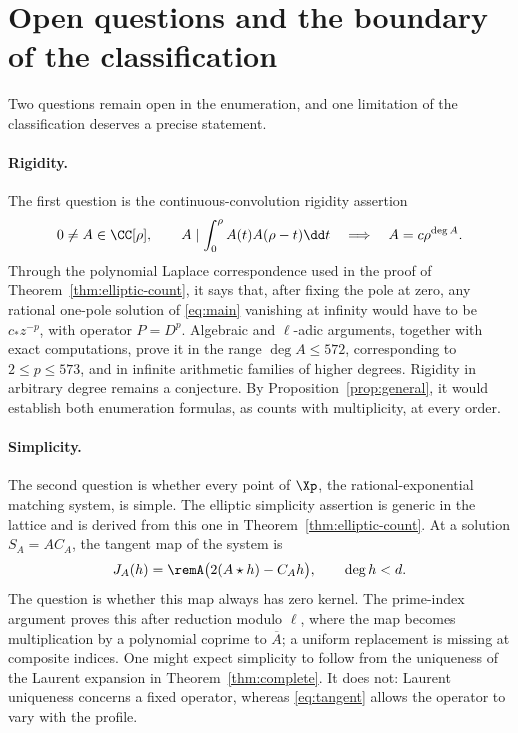 \section{Open questions and the boundary of the classification}\label{sec:open}

Two questions remain open in the enumeration, and one limitation of
the classification deserves a precise statement.

\paragraph{Rigidity.}
The first question is the continuous-convolution rigidity assertion
\[
 0\ne A\in\CC[\rho],\qquad
 A\mid\int_0^\rho A(t)A(\rho-t)\dd t
 \quad\Longrightarrow\quad A=c\rho^{\deg A}.
\]
Through the polynomial Laplace correspondence used in the proof of
Theorem~\ref{thm:elliptic-count}, it says that, after fixing the pole
at zero, any rational one-pole solution of \eqref{eq:main} vanishing at
infinity would have to be \(c_\ast z^{-p}\), with operator
\(P=D^p\).
Algebraic and \(\ell\)-adic arguments, together with exact
computations, prove it in the range
\(\deg A\le572\), corresponding to \(2\le p\le573\), and in infinite
arithmetic families of higher degrees.
Rigidity in arbitrary degree remains a conjecture.
By Proposition~\ref{prop:general}, it would establish both
enumeration formulas, as counts with multiplicity, at every order.

\paragraph{Simplicity.}
The second question is whether every point of \(\Xp\), the
rational-exponential matching system, is simple. The elliptic
simplicity assertion is generic in the lattice and is derived from
this one in Theorem~\ref{thm:elliptic-count}.
At a solution \(S_A=AC_A\), the tangent map of the system is
\begin{equation}\label{eq:tangent}
 J_A(h)=\remA\bigl(2(A\star h)-C_Ah\bigr),\qquad \deg h<d.
\end{equation}
The question is whether this map always has zero kernel.
The prime-index argument proves this after reduction modulo
\(\ell\), where the map becomes multiplication by a polynomial
coprime to \(\overline A\); a uniform replacement is missing at
composite indices.
One might expect simplicity to follow from the uniqueness of the
Laurent expansion in Theorem~\ref{thm:complete}. It does not: Laurent
uniqueness concerns a fixed operator, whereas \eqref{eq:tangent} allows
the operator to vary with the profile.

